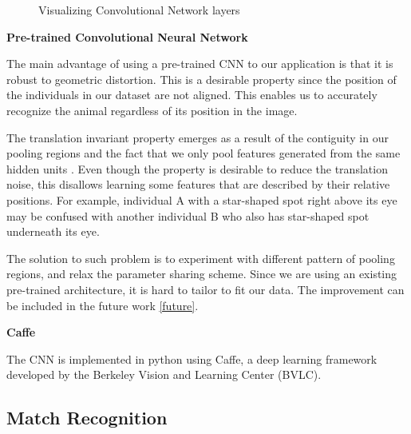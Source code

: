 \begin{figure}[h!]
  \captionsetup{justification=centering}
  \caption{Visualizing Convolutional Network layers}
\end{figure}


\textbf{Pre-trained Convolutional Neural Network}

The main advantage of using a pre-trained CNN to our application is that it is
robust to geometric distortion. This is a desirable property since the position
of the individuals in our dataset are not aligned. This enables us to
accurately recognize the animal regardless of its position in the image. 

The translation invariant property emerges as a result of the contiguity in our
pooling regions and the fact that we only pool features generated from the same
hidden units \cite{ufldl}. Even though the property is desirable to reduce the
translation noise, this disallows learning some features that are described by
their relative positions. For example, individual A with a star-shaped spot
right above its eye may be confused with another individual B who also has
star-shaped spot underneath its eye. 

The solution to such problem is to experiment with different pattern of pooling
regions, and relax the parameter sharing scheme. Since we are using an existing
pre-trained architecture, it is hard to tailor to fit our data. The improvement
can be included in the future work \ref{future}.

\textbf{Caffe}

The CNN is implemented in python using Caffe\cite{caffe}, a deep learning
framework developed by the Berkeley Vision and Learning Center (BVLC).

\subsection{Match Recognition}

